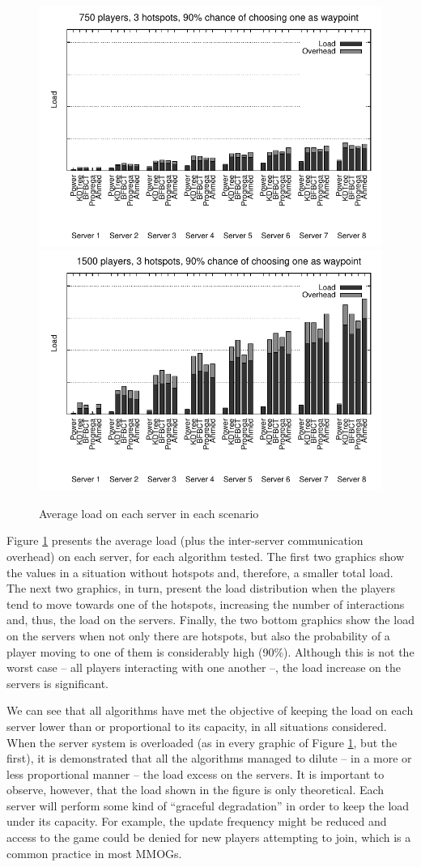 \documentclass[acmjacm]{acmtrans2m}
\begin{document}
\begin{figure}[!t]
	\includegraphics[width=0.49\linewidth]{data/750players_prob90/distribution_750_90}
	\includegraphics[width=0.49\linewidth]{data/1500players_prob90/distribution_1500_90}

	\caption{Average load on each server in each scenario}
	\label{fig:distribution}
\end{figure}

Figure \ref{fig:distribution} presents the average load (plus the inter-server communication overhead) on each server, for each algorithm tested. The first two graphics show the values in a situation without hotspots and, therefore, a smaller total load. The next two graphics, in turn, present the load distribution when the players tend to move towards one of the hotspots, increasing the number of interactions and, thus, the load on the servers. Finally, the two bottom graphics show the load on the servers when not only there are hotspots, but also the probability of a player moving to one of them is considerably high (90\%). Although this is not the worst case -- all players interacting with one another --, the load increase on the servers is significant.

We can see that all algorithms have met the objective of keeping the load on each server lower than or proportional to its capacity, in all situations considered. When the server system is overloaded (as in every graphic of Figure \ref{fig:distribution}, but the first), it is demonstrated that all the algorithms managed to dilute -- in a more or less proportional manner -- the load excess on the servers. It is important to observe, however, that the load shown in the figure is only theoretical. Each server will perform some kind of ``graceful degradation'' in order to keep the load under its capacity. For example, the update frequency might be reduced and access to the game could be denied for new players attempting to join, which is a common practice in most MMOGs.
\end{document}
